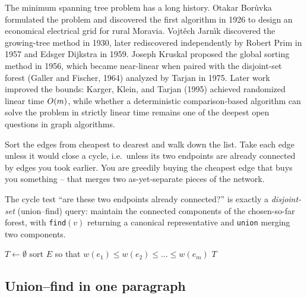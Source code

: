 \begin{historybox}
The minimum spanning tree problem has a long history. Otakar Bor\r{u}vka formulated the problem and discovered the first algorithm in 1926 to design an economical electrical grid for rural Moravia. Vojt\v{e}ch Jarn\'{\i}k discovered the growing-tree method in 1930, later rediscovered independently by Robert Prim in 1957 and Edsger Dijkstra in 1959. Joseph Kruskal proposed the global sorting method in 1956, which became near-linear when paired with the disjoint-set forest (Galler and Fischer, 1964) analyzed by Tarjan in 1975. Later work improved the bounds: Karger, Klein, and Tarjan (1995) achieved randomized linear time $O(m)$, while whether a deterministic comparison-based algorithm can solve the problem in strictly linear time remains one of the deepest open questions in graph algorithms.
\end{historybox}

\begin{intuitionbox}
Sort the edges from cheapest to dearest and walk down the list. Take each edge unless it would close a cycle, i.e.\ unless its two endpoints are already connected by edges you took earlier. You are greedily buying the cheapest edge that buys you something -- that merges two as-yet-separate pieces of the network.
\end{intuitionbox}

The cycle test ``are these two endpoints already connected?'' is exactly a \emph{disjoint-set} (union--find) query: maintain the connected components of the chosen-so-far forest, with \texttt{find}$(v)$ returning a canonical representative and \texttt{union} merging two components.

\begin{algorithm}[H]
\caption{Kruskal-MST}
\label{ch06:kruskal}
$T\gets\emptyset$\;
sort $E$ so that $w(e_1)\le w(e_2)\le\dots\le w(e_m)$\;
\Return $T$\;
\end{algorithm}

\subsection{Union--find in one paragraph}

